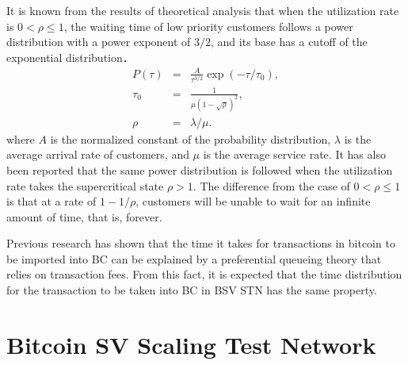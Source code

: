 \documentclass[graybox]{svmult}
\begin{document}
It is known from the results of theoretical analysis that when the utilization rate is $0 < \rho \le1 $, the waiting time of low priority customers follows a power distribution with a power exponent of $3/2$, and its base has a cutoff of the exponential distribution\cite{OB2005}．
%
\begin{eqnarray}
  P(\tau) &=& \frac{A}{\tau^{3/2}} \exp(-\tau/\tau_0), \\
  \tau_0  &=& \frac{1}{\mu (1-\sqrt{\rho})^2}, \\
  \rho    &=& \lambda / \mu.
\end{eqnarray}
%
where $A$ is the normalized constant of the probability distribution, $\lambda$ is the average arrival rate of customers, and $\mu$ is the average service rate.
It has also been reported that the same power distribution is followed when the utilization rate takes the supercritical state $\rho > 1$. 
The difference from the case of $0 < \rho \le1 $is that at a rate of $1 -1 / \rho $, customers will be unable to wait for an infinite amount of time, that is, forever.

Previous research\cite{KK2019} has shown that the time it takes for transactions in bitcoin to be imported into BC can be explained by a preferential queueing theory that relies on transaction fees.
From this fact, it is expected that the time distribution for the transaction to be taken into BC in BSV STN has the same property.



\section{Bitcoin SV Scaling Test Network}
\label{sec:stn}
\end{document}
